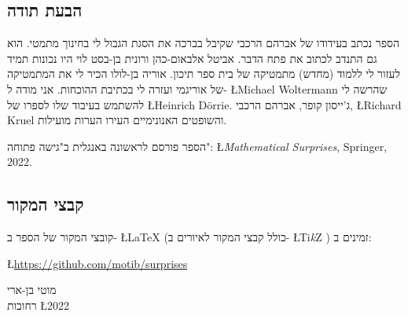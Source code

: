 
\subsection*{הבעת תודה}

הספר נכתב בעידודו של אברהם הרכבי שקיבל בברכה את הסגת הגבול לי בחינוך מתמטי. הוא גם התנדב לכתוב את פתח הדבר. אביטל אלבאום-כהן ורונית בן-בסט לוי היו נכונות תמיד לעזור לי ללמוד (מחדש) מתמטיקה של בית ספר תיכון. אוריה בן-לולו הכיר לי את המתמטיקה של אוריגמי ועזרה לי בכתיבת ההוכחות. אני מודה ל-%
\L{Michael Woltermann}
שהרשה לי להשתמש בעיבוד שלו לספרו של
\L{Heinrich D\"{o}rrie}.
ג'ייסון קופר, אברהם הרכבי,
\L{Richard Kruel}
והשופטים האנונימיים העירו הערות מועילות.

הספר פורסם לראשונה באנגלית ב"גישה פתוחה":
\L{\textit{Mathematical Surprises}, Springer, 2022}.

\subsection*{קבצי המקור}

קובצי המקור של הספר ב-%
\L{\LaTeX{}}
(כולל קבצי המקור לאיורים ב-%
\L{Ti\textit{k}Z}%
)
זמינים ב:
\begin{center}
\L{\url{https://github.com/motib/surprises}}
\end{center}

\medskip

\begin{flushleft}
מוטי בן-ארי
\\
רחובות
\L{2022}
\end{flushleft}

\tableofcontents

